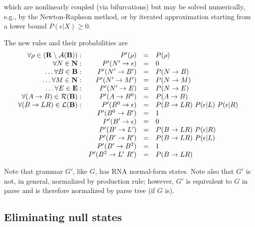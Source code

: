 \documentclass[10pt]{article}
\begin{document}
which are nonlinearly coupled (via bifurcations) but may be solved numerically, e.g., by the Newton-Raphson method,
or by iterated approximation starting from a lower bound $P(\epsilon|X) \geq 0$.

The new rules and their probabilities are
\[
\begin{array}{rrcl}
\forall \rho \in ({\bf R} \setminus {\cal A}({\bf B})): & P'(\rho)             & = & P(\rho) \\
                                \forall N \in {\bf N}: & P'(N' \to \epsilon)  & = & 0  \\
                          \ldots \forall B \in {\bf B}: & P'(N' \to B')        & = & P(N \to B) \\
                         \ldots \forall M \in {\bf N}: & P'(N' \to M')        & = & P(N \to M) \\
                         \ldots \forall E \in {\bf E}: & P'(N' \to E)         & = & P(N \to E) \\
               \forall (A \to B) \in {\cal R}({\bf B}): & P'(A \to B^0)        & = & P(A \to B) \\
              \forall (B \to LR) \in {\cal L}({\bf B}): & P'(B^0 \to \epsilon) & = & P(B \to LR)\ P(\epsilon | L)\ P(\epsilon | R) \\
                                                       & P'(B^0 \to B')       & = & 1 \\
                                                       & P'(B' \to \epsilon)  & = & 0 \\
                                                       & P'(B' \to L')        & = & P(B \to LR)\ P(\epsilon | R) \\
                                                       & P'(B' \to R')        & = & P(B \to LR)\ P(\epsilon | L) \\
                                                       & P'(B' \to B^2)       & = & 1 \\
                                                       & P'(B^2 \to L'\ R')   & = & P(B \to LR) \\
\end{array}
\]

Note that grammar $G'$, like $G$, has RNA normal-form states.
Note also that $G'$ is not, in general, normalized by production rule;
however, $G'$ is equivalent to $G$ in parse and is therefore normalized by parse tree (if $G$ is).

\subsection{Eliminating null states}
\end{document}
